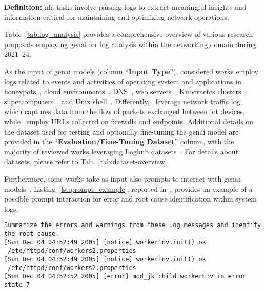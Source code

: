 
\noindent
\textbf{Definition:}
\gls{nla}
tasks involve parsing logs to extract meaningful insights and information critical for maintaining and optimizing network operations.

Table~\ref{tab:log_analysis} provides a comprehensive overview of various research proposals employing \gls{genai} for log analysis within the networking domain during $2021$--$24$. 

As the input of \gls{genai} models (column ``\textbf{Input Type}''), considered works 
employ logs related to events and activities of operating system and applications in honeypots~\cite{setianto2021gpt},
cloud environments~\cite{ott2021robust,mudgal2023assessment}, DNS~\cite{tian2024dom},
web servers~\cite{balasubramanian2024cygent, karlsen2024large,sun2023design}, 
Kubernetes clusters~\cite{sun2023design},
%
supercomputers~\cite{pan2023raglog,mudgal2023assessment, almodovar2024logfit}, 
%
and
Unix shell~\cite{boffa2024logprecis}.
Differently,~\citet{meyuhas2024} leverage network traffic log, which captures data from the flow of packets exchanged between \gls{iot} devices, while~\cite{voros2023web} employ URLs collected on firewalls and endpoints.
Additional details on the dataset used for testing and optionally fine-tuning the \gls{genai} model are provided in the ``\textbf{Evaluation/Fine-Tuning Dataset}'' column,
%
with the majority of reviewed works leveraging Loghub datasets~\cite{ott2021robust,pan2023raglog,qi2023loggpt,jiang2023lilac,mudgal2023assessment,han2023loggpt,karlsen2024large, almodovar2024logfit}.
%
For details about datasets, please refer to Tab.~\ref{tab:dataset-overview}.

Furthermore, some works take as input also prompts to interact with \gls{genai} models~\cite{setianto2021gpt, qi2023loggpt, mudgal2023assessment, balasubramanian2024cygent}.
Listing~\ref{lst:prompt_example}, reported in~\cite{mudgal2023assessment}, provides an example of a possible prompt interaction
for error and root cause identification within system logs.

\vspace{5pt}
\begin{lstlisting}[style=customlog, caption={Example of prompt.}, label={lst:prompt_example}]
Summarize the errors and warnings from these log messages and identify the root cause.
[Sun Dec 04 04:52:49 2005] [notice] workerEnv.init() ok 
 /etc/httpd/conf/workers2.properties
[Sun Dec 04 04:52:49 2005] [notice] workerEnv.init() ok 
 /etc/httpd/conf/workers2.properties
[Sun Dec 04 04:52:52 2005] [error] mod_jk child workerEnv in error state 7
\end{lstlisting}

